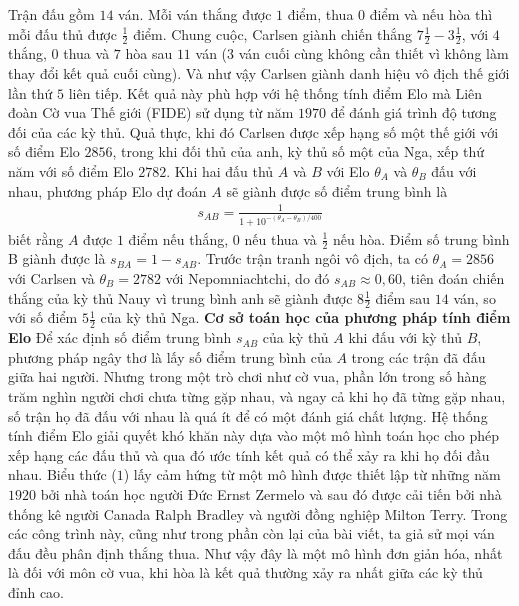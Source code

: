 \begin{multicols}{2}
	\vskip 0.05cm
	Trận đấu gồm $14$ ván. Mỗi ván thắng được $1$ điểm, thua $0$ điểm và nếu hòa thì mỗi đấu thủ được $\frac{1}{2}$ điểm. Chung cuộc, Carlsen giành chiến thắng $7\frac{1}{2} - 3\frac{1}{2}$, với $4$ thắng, $0$ thua và $7$ hòa sau $11$ ván ($3$ ván cuối cùng không cần thiết vì không làm thay đổi kết quả cuối cùng). Và như vậy Carlsen giành danh hiệu vô địch thế giới lần thứ $5$ liên tiếp.
	\vskip 0.05cm
	Kết quả này phù hợp với hệ thống tính điểm Elo mà Liên đoàn Cờ vua Thế giới (FIDE) sử dụng từ năm $1970$ để đánh giá trình độ tương đối của các kỳ thủ. Quả thực, khi đó Carlsen được xếp hạng số một thế giới với số điểm Elo $2856$, trong khi đối thủ của anh, kỳ thủ số một của Nga, xếp thứ năm với số điểm Elo $2782$.
	\vskip 0.05cm
	Khi hai đấu thủ $A$ và $B$ với Elo $\theta_A$ và $\theta_B$ đấu với nhau, phương pháp Elo dự đoán $A$ sẽ giành được số điểm trung bình là
	\setlength{\abovedisplayskip}{4pt}
	\setlength{\belowdisplayskip}{4pt}
	\begin{align*}
		s_{AB} = \frac{1}{1+ 10^{-(\theta_A - \theta_B) /400}} \tag{$1$}
	\end{align*}
	biết rằng $A$ được $1$ điểm nếu thắng, $0$ nếu thua và $\frac{1}{2}$ nếu hòa. Điểm số trung bình B giành được là $s_{BA} = 1 - s_{AB}$.
	\vskip 0.05cm
	Trước trận tranh ngôi vô địch, ta có $\theta_A = 2856$ với Carlsen và $\theta_B = 2782$ với Nepomniachtchi, do đó $s_{AB} \approx 0{,}60$, tiên đoán chiến thắng của kỳ thủ Nauy vì trung bình anh sẽ giành được $8\frac{1}{2}$ điểm sau $14$ ván, so với số điểm $5\frac{1}{2}$ của kỳ thủ Nga.
	\vskip 0.05cm
	\textbf{\color{toanhocdoisong}Cơ sở toán học của phương pháp tính điểm Elo}
	\vskip 0.05cm
	Để xác định số điểm trung bình $s_{AB}$ của kỳ thủ $A$ khi đấu với kỳ thủ $B$, phương pháp ngây thơ là lấy số điểm trung bình của $A$ trong các trận đã đấu giữa hai người. Nhưng trong một trò chơi như cờ vua, phần lớn trong số hàng trăm nghìn người chơi chưa từng gặp nhau, và ngay cả khi họ đã từng gặp nhau, số trận họ đã đấu với nhau là quá ít để có một đánh giá chất lượng. Hệ thống tính điểm Elo giải quyết khó khăn này dựa vào một mô hình toán học cho phép xếp hạng các đấu thủ và qua đó ước tính kết quả có thể xảy ra khi họ đối đầu nhau.
	\vskip 0.02cm
	Biểu thức ($1$) lấy cảm hứng từ một mô hình được thiết lập từ những năm $1920$ bởi nhà toán học người Đức Ernst Zermelo và sau đó được cải tiến bởi nhà thống kê người Canada Ralph Bradley và người đồng nghiệp Milton Terry. Trong các công trình này, cũng như trong phần còn lại của bài viết, ta giả sử mọi ván đấu đều phân định thắng thua. Như vậy đây là một mô hình đơn giản hóa, nhất là đối với môn cờ vua, khi hòa là kết quả thường xảy ra nhất giữa các kỳ thủ đỉnh cao.

\end{multicols}
